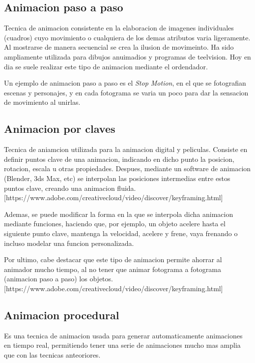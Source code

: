 \documentclass{article}
\begin{document}
\subsection{Animacion paso a paso}

Tecnica de animacion consistente en la elaboracion de imagenes individuales (cuadros) cuyo movimiento o cualquiera de los demas atributos varia ligeramente. Al mostrarse de manera secuencial se crea la ilusion de movimeinto. Ha sido ampliamente utilizada para dibujos anuimadios y programas de teelvision. Hoy en dia se suele realizar este tipo de animacion mediante el ordendador.

\bigskip

Un ejemplo de animacion paso a paso es el \textit{Stop Motion}, en el que se fotografian escenas y personajes, y en cada fotograma se varia un poco para dar la sensacion de movimiento al unirlas.


\subsection{Animacion por claves}

Tecnica de aniamcion utilizada para la animacion digital y peliculas. Consiste en definir puntos clave de una animacion, indicando en dicho punto la posicion, rotacion, escala u otras propiedades. Despues, mediante un software de animacion (Blender, 3ds Max, etc) se interpolan las posiciones intermedias entre estos puntos clave, creando una animacion fluida. [https://www.adobe.com/creativecloud/video/discover/keyframing.html]

\bigskip

Ademas, se puede modificar la forma en la que se interpola dicha animacion mediante funciones, haciendo que, por ejemplo, un objeto acelere hasta el siguiente punto clave, mantenga la velocidad, acelere y frene, vaya frenando o incluso modelar una funcion personalizada.

\bigskip

Por ultimo, cabe destacar que este tipo de animacion permite ahorrar al animador mucho tiempo, al no tener que animar fotograma a fotograma (animacion paso a paso) los objetos. [https://www.adobe.com/creativecloud/video/discover/keyframing.html]


\subsection{Animacion procedural}

Es una tecnica de animacion usada para generar automaticamente animaciones en tiempo real, permitiendo tener una serie de animaciones mucho mas amplia que con las tecnicas anteoriores. %
\end{document}
